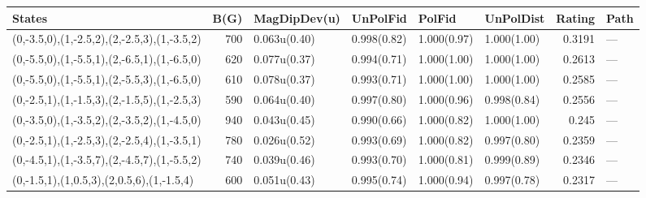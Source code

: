 \begin{tabular}{lrllllrl}
\hline
 States                                      &   B(G) & MagDipDev(u)   & UnPolFid    & PolFid      & UnPolDist   &   Rating & Path   \\
\hline
 (0,-3.5,0),(1,-2.5,2),(2,-2.5,3),(1,-3.5,2) &    700 & 0.063u(0.40)   & 0.998(0.82) & 1.000(0.97) & 1.000(1.00) &   0.3191 & ---    \\
 (0,-5.5,0),(1,-5.5,1),(2,-6.5,1),(1,-6.5,0) &    620 & 0.077u(0.37)   & 0.994(0.71) & 1.000(1.00) & 1.000(1.00) &   0.2613 & ---    \\
 (0,-5.5,0),(1,-5.5,1),(2,-5.5,3),(1,-6.5,0) &    610 & 0.078u(0.37)   & 0.993(0.71) & 1.000(1.00) & 1.000(1.00) &   0.2585 & ---    \\
 (0,-2.5,1),(1,-1.5,3),(2,-1.5,5),(1,-2.5,3) &    590 & 0.064u(0.40)   & 0.997(0.80) & 1.000(0.96) & 0.998(0.84) &   0.2556 & ---    \\
 (0,-3.5,0),(1,-3.5,2),(2,-3.5,2),(1,-4.5,0) &    940 & 0.043u(0.45)   & 0.990(0.66) & 1.000(0.82) & 1.000(1.00) &   0.245  & ---    \\
 (0,-2.5,1),(1,-2.5,3),(2,-2.5,4),(1,-3.5,1) &    780 & 0.026u(0.52)   & 0.993(0.69) & 1.000(0.82) & 0.997(0.80) &   0.2359 & ---    \\
 (0,-4.5,1),(1,-3.5,7),(2,-4.5,7),(1,-5.5,2) &    740 & 0.039u(0.46)   & 0.993(0.70) & 1.000(0.81) & 0.999(0.89) &   0.2346 & ---    \\
 (0,-1.5,1),(1,0.5,3),(2,0.5,6),(1,-1.5,4)   &    600 & 0.051u(0.43)   & 0.995(0.74) & 1.000(0.94) & 0.997(0.78) &   0.2317 & ---    \\
\hline
\end{tabular}